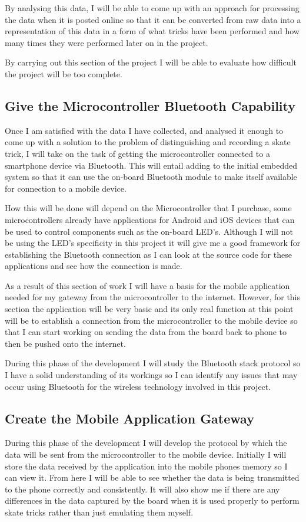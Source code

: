 By analysing this data, I will be able to come up with an approach for processing the data when it is posted online so that it can be converted from raw data into a representation of this data in a form of what tricks have been performed and how many times they were performed later on in the project.

By carrying out this section of the project I will be able to evaluate how difficult the project will be too complete.

\subsection{Give the Microcontroller Bluetooth Capability}\label{tor:bluetoothcapability}
Once I am satisfied with the data I have collected, and analysed it enough to come up with a solution to the problem of distinguishing and recording a skate trick, I will take on the task of getting the microcontroller connected to a smartphone device via Bluetooth. This will entail adding to the initial embedded system so that it can use the on-board Bluetooth module to make itself available for connection to a mobile device.

How this will be done will depend on the Microcontroller that I purchase, some microcontrollers already have applications for Android and iOS devices that can be used to control components such as the on-board LED’s. Although I will not be using the LED’s specificity in this project it will give me a good framework for establishing the Bluetooth connection as I can look at the source code for these applications and see how the connection is made.

As a result of this section of work I will have a basis for the mobile application needed for my gateway from the microcontroller to the internet. However, for this section the application will be very basic and its only real function at this point will be to establish a connection from the microcontroller to the mobile device so that I can start working on sending the data from the board back to phone to then be pushed onto the internet.

During this phase of the development I will study the Bluetooth stack protocol so I have a solid understanding of its workings so I can identify any issues that may occur using Bluetooth for the wireless technology involved in this project.

\subsection{Create the Mobile Application Gateway}\label{tor:mobileappgateway}
During this phase of the development I will develop the protocol by which the data will be sent from the microcontroller to the mobile device. Initially I will store the data received by the application into the mobile phones memory so I can view it. From here I will be able to see whether the data is being transmitted to the phone correctly and consistently. It will also show me if there are any differences in the data captured by the board when it is used properly to perform skate tricks rather than just emulating them myself. 

